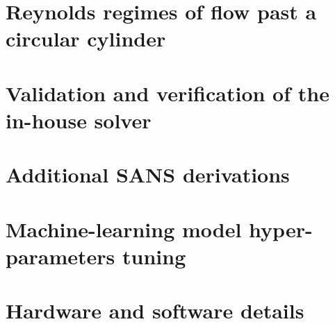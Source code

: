 \documentclass[11pt, a4paper]{etc/feereport}
\begin{document}
\appendix

\chapter{Reynolds regimes of flow past a circular cylinder}

\chapter{Validation and verification of the in-house solver}

\chapter{Additional SANS derivations}

\chapter{Machine-learning model hyper-parameters tuning}

\chapter{Hardware and software details}


\backmatter



\end{document}
